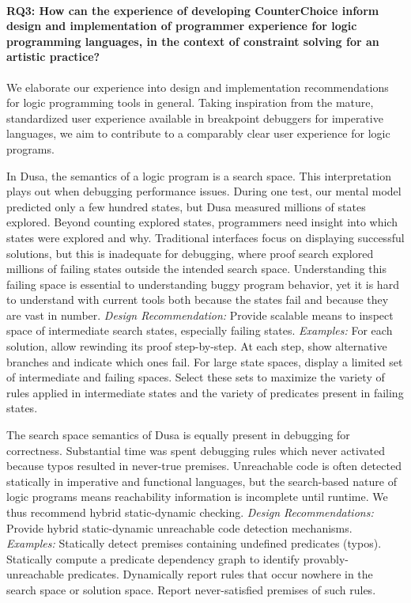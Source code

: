 \paragraph{RQ3: How can the experience of developing CounterChoice 
    inform design and implementation of programmer experience for logic 
    programming languages, in the context of constraint solving for an artistic
    practice?}

We elaborate our experience into design and implementation recommendations for logic programming tools in general.
Taking inspiration from the mature, standardized user experience available in breakpoint debuggers for imperative languages, we aim to contribute to a comparably clear user experience for logic programs.

In Dusa, the semantics of a logic program is a search space.
This interpretation plays out when debugging performance issues.
During one test, our mental model predicted only a few hundred states, but Dusa measured millions of states explored.
Beyond counting explored states, programmers need insight into which states were explored and why.
Traditional interfaces focus on displaying successful solutions, but this is inadequate for debugging, where proof search explored millions of failing states outside the intended search space. 
Understanding this failing space is essential to understanding buggy program behavior, yet it is hard to understand with current tools both because the states fail and because they are vast in number.
\emph{Design Recommendation:} Provide scalable means to inspect space of intermediate search states, especially failing states.
\emph{Examples:} For each solution, allow rewinding its proof step-by-step. At each step, show alternative branches and indicate which ones fail. 
For large state spaces, display a limited set of intermediate and failing spaces.
Select these sets to maximize the variety of rules applied in intermediate states and the variety of predicates present in failing states.

The search space semantics of Dusa is equally present in debugging for correctness.
Substantial time was spent debugging rules which never activated because typos resulted in never-true premises.
Unreachable code is often detected statically in imperative and functional languages, but the search-based nature of logic programs means reachability information is incomplete until runtime.
We thus recommend hybrid static-dynamic checking.
\emph{Design Recommendations:} Provide hybrid static-dynamic unreachable code detection mechanisms.
\emph{Examples:} Statically detect premises containing undefined predicates (typos). Statically compute a predicate dependency graph to identify provably-unreachable predicates. 
Dynamically report rules that occur nowhere in the search space or solution space. Report never-satisfied premises of such rules.

